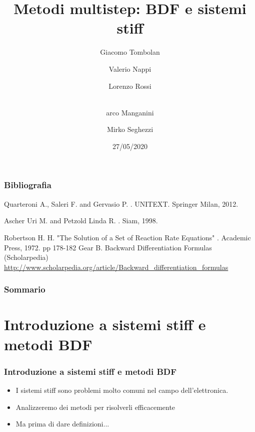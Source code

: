 \documentclass[aspectratio=169, 10pt, handout,usenames,dvipsnames]{beamer}
\title{Metodi multistep: BDF e sistemi stiff}
\date{27/05/2020}
\author{Giacomo Tombolan \and Valerio Nappi \and 
      Lorenzo Rossi \and  \texorpdfstring{\\} Marco Manganini \and
      Mirko Seghezzi}
\begin{document}
\begin{frame}
  \maketitle
\end{frame}


\begin{frame}


  \frametitle{Bibliografia}
  \begin{thebibliography}{99}\small
    
    Quarteroni A., Saleri F. and Gervasio P.
    .
    \newblock UNITEXT. Springer Milan, 2012.

    Ascher Uri M. and Petzold Linda R.
    .
    \newblock Siam, 1998.

    Robertson H. H. "The Solution of a Set of Reaction Rate Equations"
    .
    \newblock Academic Press, 1972. pp 178-182
    Gear B.
    \newblock Backward Differentiation Formulas (Scholarpedia)
    \newblock \url{http://www.scholarpedia.org/article/Backward_differentiation_formulas}
  

   \end{thebibliography}

  
\end{frame}  




\begin{frame}
  \frametitle{Sommario}
  \tableofcontents
\end{frame}


\section{Introduzione a sistemi stiff e metodi BDF}\label{sec:sec1}
\begin{frame} \frametitle{Introduzione a sistemi stiff e metodi BDF}
    \begin{itemize}
        \item I sistemi stiff sono problemi molto comuni nel campo dell'elettronica. 
        \item Analizzeremo dei metodi per risolverli efficacemente
        \item Ma prima di dare definizioni...
    \end{itemize}
\end{frame}
\end{document}
